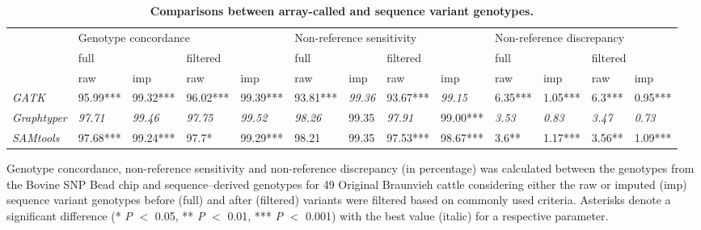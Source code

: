 \documentclass[../main.tex]{subfiles}
\begin{document}
\begin{landscape}
    \begin{table}
        \centering
        \caption[Comparisons between array-called and sequence variant genotypes]{\textbf{Comparisons between array-called and sequence variant genotypes.}}
        \small
        \begin{tabular}{|l|l|l|l|l|l|l|l|l|l|l|l|l|} 
        \cline{2-13}
        \multicolumn{1}{l|}{\multirow{3}{*}{~}} & \multicolumn{4}{l|}{Genotype concordance}                         & \multicolumn{4}{l|}{Non-reference sensitivity}                    & \multicolumn{4}{l|}{Non-reference discrepancy}                 \\ 
        \cline{2-13}
        \multicolumn{1}{l|}{}                   & \multicolumn{2}{l|}{full}       & \multicolumn{2}{l|}{filtered}   & \multicolumn{2}{l|}{full}       & \multicolumn{2}{l|}{filtered}   & \multicolumn{2}{l|}{full}     & \multicolumn{2}{l|}{filtered}  \\ 
        \cline{2-13}
        \multicolumn{1}{l|}{}                   & raw            & imp            & raw            & imp            & raw            & imp            & raw            & imp            & raw           & imp           & raw           & imp            \\ 
        \arrayrulecolor{black}\cline{1-1}\arrayrulecolor{black}\cline{2-13}
        \textit{GATK}                           & 95.99***       & 99.32***       & 96.02***       & 99.39***       & 93.81***       & \textit{99.36} & 93.67***       & \textit{99.15} & 6.35***       & 1.05***       & 6.3***        & 0.95***        \\ 
        \hline
        \textit{Graphtyper}                     & \textit{97.71} & \textit{99.46} & \textit{97.75} & \textit{99.52} & \textit{98.26} & 99.35          & \textit{97.91} & 99.00***       & \textit{3.53} & \textit{0.83} & \textit{3.47} & \textit{0.73}  \\ 
        \hline
        \textit{SAMtools}                       & 97.68***       & 99.24***       & 97.7*          & 99.29***       & 98.21          & 99.35          & 97.53***       & 98.67***       & 3.6**         & 1.17***       & 3.56**        & 1.09***        \\
        \hline
        \end{tabular}
        \label{tab:varcomp}
        \end{table}
        \singlespacing
        \small{Genotype concordance, non-reference sensitivity and non-reference discrepancy (in percentage) was calculated between 
        the genotypes from the Bovine SNP Bead chip and sequence–derived genotypes for 49 Original Braunvieh cattle considering either the raw or imputed (imp) sequence variant 
        genotypes before (full) and after (filtered) variants were filtered based on commonly used criteria. 
        Asterisks denote a significant difference (* \emph{P} $<$ 0.05, ** \emph{P} $<$ 0.01, *** \emph{P} $<$ 0.001) with the best value (italic) for a respective parameter.}

\end{landscape}
\end{document}
